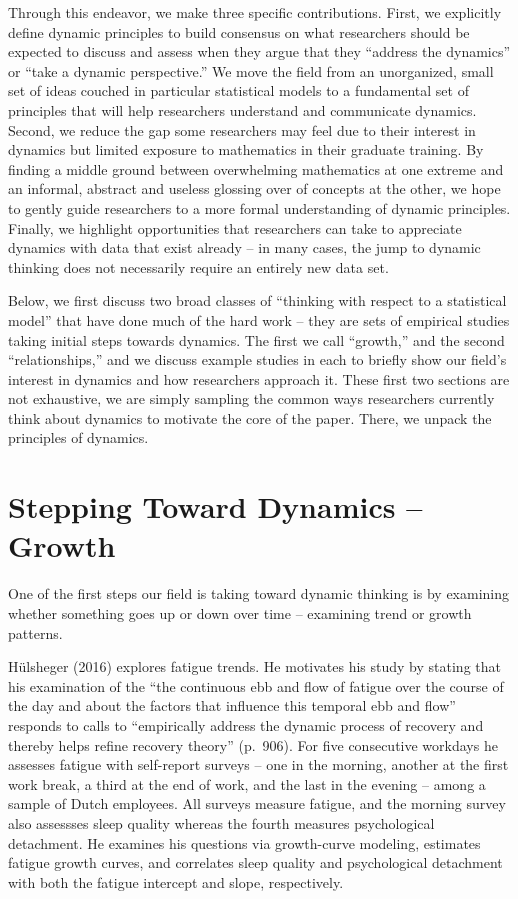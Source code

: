 \documentclass[english,,man]{apa6}
\theoremstyle{definition}
\theoremstyle{definition}
\theoremstyle{definition}
\theoremstyle{remark}
\begin{document}
Through this endeavor, we make three specific contributions. First, we
explicitly define dynamic principles to build consensus on what
researchers should be expected to discuss and assess when they argue
that they \enquote{address the dynamics} or \enquote{take a dynamic
perspective.} We move the field from an unorganized, small set of ideas
couched in particular statistical models to a fundamental set of
principles that will help researchers understand and communicate
dynamics. Second, we reduce the gap some researchers may feel due to
their interest in dynamics but limited exposure to mathematics in their
graduate training. By finding a middle ground between overwhelming
mathematics at one extreme and an informal, abstract and useless
glossing over of concepts at the other, we hope to gently guide
researchers to a more formal understanding of dynamic principles.
Finally, we highlight opportunities that researchers can take to
appreciate dynamics with data that exist already -- in many cases, the
jump to dynamic thinking does not necessarily require an entirely new
data set.

Below, we first discuss two broad classes of \enquote{thinking with
respect to a statistical model} that have done much of the hard work --
they are sets of empirical studies taking initial steps towards
dynamics. The first we call \enquote{growth,} and the second
\enquote{relationships,} and we discuss example studies in each to
briefly show our field's interest in dynamics and how researchers
approach it. These first two sections are not exhaustive, we are simply
sampling the common ways researchers currently think about dynamics to
motivate the core of the paper. There, we unpack the principles of
dynamics.

\hypertarget{stepping-toward-dynamics-growth}{%
\section{Stepping Toward Dynamics --
Growth}\label{stepping-toward-dynamics-growth}}

One of the first steps our field is taking toward dynamic thinking is by
examining whether something goes up or down over time -- examining trend
or growth patterns.

Hülsheger (2016) explores fatigue trends. He motivates his study by
stating that his examination of the \enquote{the continuous ebb and flow
of fatigue over the course of the day and about the factors that
influence this temporal ebb and flow} responds to calls to
\enquote{empirically address the dynamic process of recovery and thereby
helps refine recovery theory} (p.~906). For five consecutive workdays he
assesses fatigue with self-report surveys -- one in the morning, another
at the first work break, a third at the end of work, and the last in the
evening -- among a sample of Dutch employees. All surveys measure
fatigue, and the morning survey also assessses sleep quality whereas the
fourth measures psychological detachment. He examines his questions via
growth-curve modeling, estimates fatigue growth curves, and correlates
sleep quality and psychological detachment with both the fatigue
intercept and slope, respectively.
\end{document}
